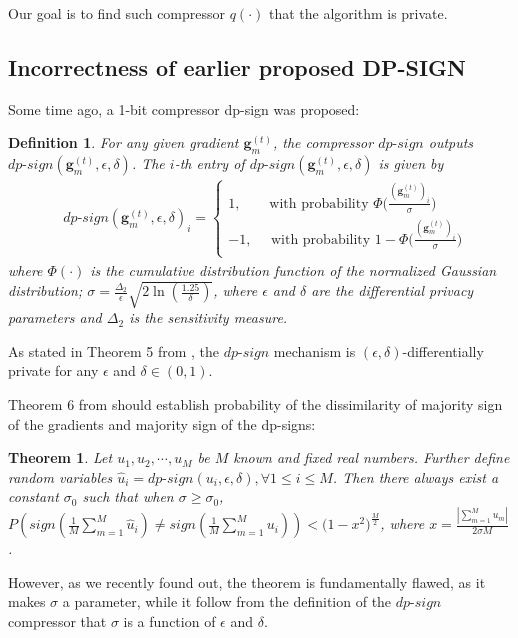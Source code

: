 \documentclass[12pt]{article}
\newtheorem{theorem}{Theorem}
\newtheorem{definition}{Definition}
\begin{document}
Our goal is to find such compressor $q(\cdot)$ that the algorithm is private.

\subsection{Incorrectness of earlier proposed DP-SIGN}
Some time ago, a 1-bit compressor dp-sign \cite{Jin2020} was proposed:

\begin{definition}
    For any given gradient $\boldsymbol{g}_{m}^{(t)}$, the compressor $dp\text{-}sign$ outputs $dp\text{-}sign(\boldsymbol{g}_{m}^{(t)},\epsilon,\delta)$. The $i$-th entry of $dp\text{-}sign(\boldsymbol{g}_{m}^{(t)},\epsilon,\delta)$ is given by
    \begin{equation}\label{dpsignsgd}
    \begin{split}
    &dp\text{-}sign(\boldsymbol{g}_{m}^{(t)},\epsilon,\delta)_{i} =
    \begin{cases}
    1, ~~~~~~~~~ \text{with probability $\Phi\big(\frac{(\boldsymbol{g}_{m}^{(t)})_{i}}{\sigma}\big)$} \\
    -1,  ~~~~~~\text{with probability $1-\Phi\big(\frac{(\boldsymbol{g}_{m}^{(t)})_{i}}{\sigma}\big)$}\\
    \end{cases}
    \end{split}
    \end{equation}
    where $\Phi(\cdot)$ is the cumulative distribution function of the normalized Gaussian distribution; $\sigma = \frac{\Delta_{2}}{\epsilon}\sqrt{2\ln(\frac{1.25}{\delta})}$, where $\epsilon$ and $\delta$ are the differential privacy parameters and $\Delta_2$ is the sensitivity measure.
\end{definition}
As stated in Theorem 5 from \cite{Jin2020}, the $dp\text{-}sign$ mechanism is $(\epsilon, \delta)$-differentially private for any $\epsilon$ and $\delta \in (0, 1)$.

Theorem 6 from \cite{Jin2020} should establish probability of the dissimilarity of majority sign of the gradients and majority sign of the dp-signs:   
\begin{theorem}\label{dp-sign-probabilities}
    Let $u_{1},u_{2},\cdots,u_{M}$ be $M$ known and fixed real numbers. Further define random variables $\hat{u}_{i}=dp\text{-}sign(u_{i},\epsilon,\delta), \forall 1\leq i \leq M$. Then there always exist a constant $\sigma_{0}$ such that when $\sigma \geq \sigma_{0}$, $P(sign(\frac{1}{M}\sum_{m=1}^{M}\hat{u}_{i})\neq sign(\frac{1}{M}\sum_{m=1}^{M}u_{i})) <\big(1-x^2\big)^{\frac{M}{2}}$,
    where $x = \frac{|\sum_{m=1}^{M}u_{m}|}{2\sigma M}$.
\end{theorem}
However, as we recently found out, the theorem is fundamentally flawed, as it makes $\sigma$ a parameter, while it follow from the definition of the $dp\text{-}sign$ compressor that $\sigma$ is a function of $\epsilon$ and $\delta$. 
\end{document}

